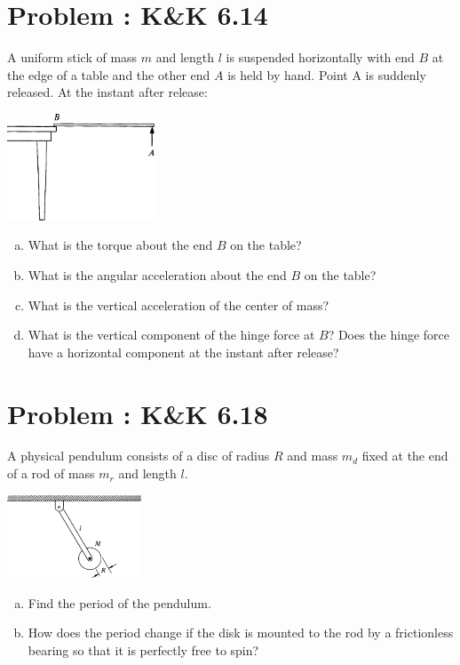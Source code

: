 \documentclass[problems]{esg8012pset}
\date{Month Day\csname latex@error\endcsname {Date not yet decided}}
\begin{document}
\section{Problem \thesection: K\&K 6.14}
  A uniform stick of mass $m$ and length $l$ is suspended horizontally with end $B$ at the edge of a table and the other end $A$ is held by hand. Point A is suddenly released. At the instant after release:
  \begin{center}\includegraphics[width=0.33\textwidth]{ps09_1}\end{center}
  \begin{enumerate}[(a)]
    \item What is the torque about the end $B$ on the table?
    \item What is the angular acceleration about the end $B$ on the table?
    \item What is the vertical acceleration of the center of mass?
    \item What is the vertical component of the hinge force at $B$? Does the hinge force have a horizontal component at the instant after release?
  \end{enumerate}
\section{Problem \thesection: K\&K 6.18}
  A physical pendulum consists of a disc of radius $R$ and mass $m_d$ fixed at the end of a rod of mass $m_r$ and length $l$.
  \begin{center}\includegraphics[width=0.3\textwidth]{ps09_2}\end{center}
  \begin{enumerate}[(a)]
    \item Find the period of the pendulum.
    \item How does the period change if the disk is mounted to the rod by a frictionless bearing so that it is perfectly free to spin?
  \end{enumerate}
\end{document}
